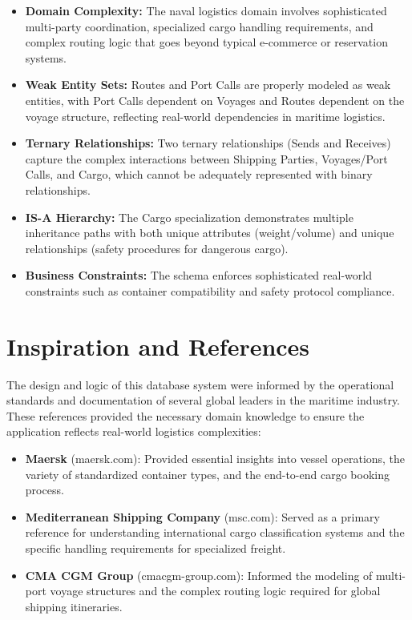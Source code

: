 \documentclass[11pt]{article}
\begin{document}
\begin{itemize}
    \item \textbf{Domain Complexity:} The naval logistics domain involves sophisticated multi-party coordination, specialized cargo handling requirements, and complex routing logic that goes beyond typical e-commerce or reservation systems.
    
    \item \textbf{Weak Entity Sets:} Routes and Port Calls are properly modeled as weak entities, with Port Calls dependent on Voyages and Routes dependent on the voyage structure, reflecting real-world dependencies in maritime logistics.
    
    \item \textbf{Ternary Relationships:} Two ternary relationships (Sends and Receives) capture the complex interactions between Shipping Parties, Voyages/Port Calls, and Cargo, which cannot be adequately represented with binary relationships.
    
    \item \textbf{IS-A Hierarchy:} The Cargo specialization demonstrates multiple inheritance paths with both unique attributes (weight/volume) and unique relationships (safety procedures for dangerous cargo).
    
    \item \textbf{Business Constraints:} The schema enforces sophisticated real-world constraints such as container compatibility and safety protocol compliance.
\end{itemize}

\section{Inspiration and References}

The design and logic of this database system were informed by the operational standards and documentation of several global leaders in the maritime industry. These references provided the necessary domain knowledge to ensure the application reflects real-world logistics complexities:

\begin{itemize}
    \item \textbf{Maersk} (maersk.com): Provided essential insights into vessel operations, the variety of standardized container types, and the end-to-end cargo booking process.
    
    \item \textbf{Mediterranean Shipping Company} (msc.com): Served as a primary reference for understanding international cargo classification systems and the specific handling requirements for specialized freight.
    
    \item \textbf{CMA CGM Group} (cmacgm-group.com): Informed the modeling of multi-port voyage structures and the complex routing logic required for global shipping itineraries.
\end{itemize}
\end{document}
